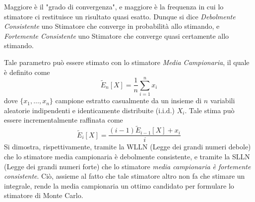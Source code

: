 Maggiore \`e il "grado di convergenza", e maggiore \`e la frequenza in cui lo stimatore ci restituisce un risultato quasi esatto. Dunque si dice
\textit{Debolmente Consistente} uno Stimatore che converge in probabilit\`a allo stimando, e \textit{Fortemente Consistente} uno Stimatore che 
converge quasi certamente allo stimando.\par
Tale parametro pu\`o essere stimato con lo stimatore \textit{Media Campionaria}, il quale \`e definito come 
\begin{equation}
	\tilde{E}_n[X]=\frac{1}{n}\sum_{i=1}^nx_i
\end{equation}
dove $\{x_1,\ldots,x_n\}$ campione estratto casualmente da un insieme di $n$ variabili aleatorie indipendenti e identicamente distribuite (i.i.d.) 
$X_i$.
Tale stima pu\`o essere incrementalmente raffinata come 
\begin{equation}
	\tilde{E}_i[X]=\frac{(i-1)\tilde{E}_{i-1}[X]+x_i}{i}
\end{equation}
Si dimostra, rispettivamente, tramite la WLLN (Legge dei grandi numeri debole) che lo stimatore media campionaria \`e debolmente consistente, e tramite
la SLLN (Legge dei grandi numeri forte) che lo stimatore \textit{media campionaria \`e fortemente consistente}. Ci\`o, assieme al fatto che 
tale stimatore altro non fa che stimare un integrale, rende la media campionaria un ottimo candidato per formulare lo stimatore di Monte Carlo.\par
